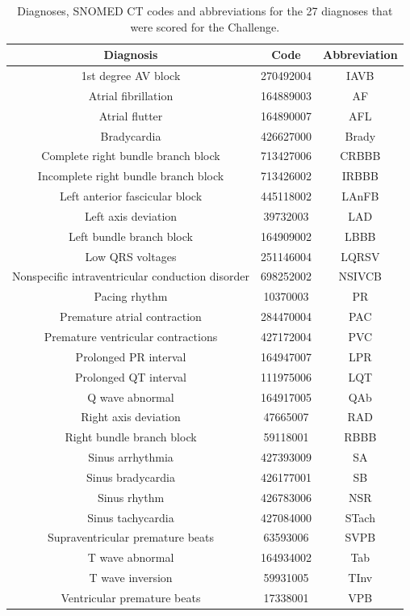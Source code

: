 \begin{table}[H]
\begin{center}
\begin{tabular}{|c | c | c |}
 \hline
\textbf{Diagnosis} & \textbf{Code} & \textbf{Abbreviation} \\ [0.4ex] 
\hline \hline
1st degree AV block  & 270492004 & IAVB \\ \hline
Atrial fibrillation  & 164889003 & AF \\ \hline
Atrial flutter  & 164890007 & AFL \\ \hline
Bradycardia  & 426627000 & Brady \\ \hline
Complete right bundle branch block  & 713427006 & CRBBB \\ \hline
Incomplete right bundle branch block  & 713426002 & IRBBB \\ \hline
Left anterior fascicular block  & 445118002 & LAnFB \\ \hline
Left axis deviation  & 39732003 & LAD \\ \hline
Left bundle branch block  & 164909002 & LBBB \\ \hline
Low QRS voltages  & 251146004 & LQRSV \\ \hline
Nonspecific intraventricular conduction disorder  & 698252002 & NSIVCB \\ \hline
Pacing rhythm  & 10370003 & PR \\ \hline
Premature atrial contraction  & 284470004 & PAC \\ \hline
Premature ventricular contractions  & 427172004 & PVC \\ \hline
Prolonged PR interval  & 164947007 & LPR \\ \hline
Prolonged QT interval  & 111975006 & LQT \\ \hline
Q wave abnormal  & 164917005 & QAb \\ \hline
Right axis deviation  & 47665007 & RAD \\ \hline
Right bundle branch block  & 59118001 & RBBB \\ \hline
Sinus arrhythmia  & 427393009 & SA \\ \hline
Sinus bradycardia  & 426177001 & SB \\ \hline
Sinus rhythm  & 426783006 & NSR \\ \hline
Sinus tachycardia  & 427084000 & STach \\ \hline
Supraventricular premature beats  & 63593006 & SVPB \\ \hline
T wave abnormal  & 164934002 & Tab \\ \hline
T wave inversion  & 59931005 & TInv \\ \hline
Ventricular premature beats  & 17338001 & VPB \\ \hline

\hline\hline
\end{tabular}
\end{center}
\caption{Diagnoses, SNOMED CT codes and abbreviations for the 27 diagnoses that were scored for the Challenge.}
\label{table:diagnoses_SNOMED}
\end{table}

